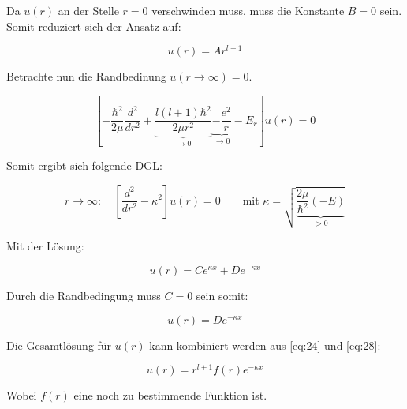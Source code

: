Da \(u(r)\) an der Stelle \(r=0\) verschwinden muss, muss die Konstante \(B=0\) sein. Somit reduziert sich der Ansatz auf:

\begin{equation}
  \label{eq:24}
  u(r) = Ar^{l+1}
\end{equation}

Betrachte nun die Randbedinung \(u(r\to \infty) = 0\).

\begin{equation}
  \label{eq:25}
  \left[-\frac{\hbar^2}{2\mu}\frac{d^2}{dr^2} + \underbrace{\frac{l(l+1)\hbar^2}{2\mu r^2}}_{\to 0}  \underbrace{- \frac{e^2}{r} }_{\to 0} - E_r  \right] u(r)   = 0 
\end{equation}

Somit ergibt sich folgende DGL:

\begin{equation}
  \label{eq:26}
  r\to \infty: \quad\left[\frac{d^2}{dr^2} - \kappa^2\right]u(r) = 0 \qquad \text{mit }\kappa = \sqrt{\underbrace{\frac{2\mu}{\hbar^2}(-E)}_{>0}}
\end{equation}

Mit der Lösung:

\begin{equation}
  \label{eq:27}
  u(r) = Ce^{\kappa x}+De^{-\kappa x}
\end{equation}

Durch die Randbedingung muss \(C=0\) sein somit:

\begin{equation}
  \label{eq:28}
    u(r) = De^{-\kappa x}
\end{equation}

Die Gesamtlösung für \(u(r)\) kann kombiniert werden aus \eqref{eq:24} und \eqref{eq:28}:

\begin{equation}
  \label{eq:29}
  u(r) = r^{l+1}f(r)e^{-\kappa x}
\end{equation}

Wobei \(f(r)\) eine noch zu bestimmende Funktion ist.





